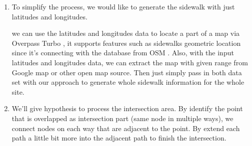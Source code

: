 \begin{enumerate}
    \item To simplify the process, we would like to generate the sidewalk with just latitudes and longitudes.
    
    we can use the latitudes and longitudes data to locate a part of a map via Overpass Turbo \cite{overpass_turbo}, it supports features such as sidewalks geometric location since it's connecting with the database from \ac{OSM} \cite{OpenStreetMap}. Also, with the input latitudes and longitudes data, we can extract the map with given range from Google map or other open map source. Then just simply pass in both data set with our approach to generate whole sidewalk information for the whole site. 
    
    \item We'll give hypothesis to process the intersection area. By identify the point that is overlapped as intersection part (same node in multiple ways), we connect nodes on each way that are adjacent to the point. By extend each path a little bit more into the adjacent path to finish the intersection.
    
\end{enumerate}